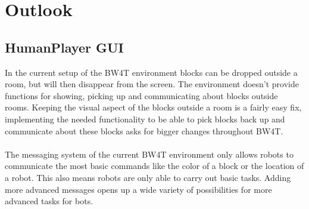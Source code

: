 \documentclass{article}
\begin{document}
\section*{Outlook}

\subsection*{HumanPlayer GUI}
In the current setup of the BW4T environment blocks can be dropped outside a room, but will then disappear from the screen. The environment doesn't provide functions for showing, picking up and communicating about blocks outside rooms. Keeping the visual aspect of the blocks outside a room is a fairly easy fix, implementing the needed functionality to be able to pick blocks back up and communicate about these blocks asks for bigger changes throughout BW4T. \\
\\
The messaging system of the current BW4T environment only allows robots to communicate the most basic commands like the color of a block or the location of a robot. This also means robots are only able to carry out basic tasks. Adding more advanced messages opens up a wide variety of possibilities for more advanced tasks for bots.
\end{document}
